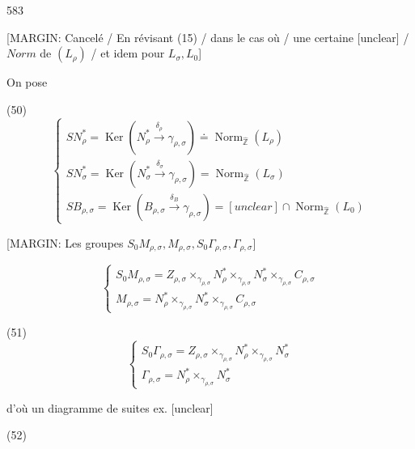 \begin{enumerate}

\newpage


583

[MARGIN: Cancelé / En révisant (15) / dans le cas où / une certaine [unclear] / $Norm$ de $(L_\rho)$ / et idem pour $L_\sigma, L_0$]

On pose

(50)
$$
\begin{cases} 
S N_\rho^* = \operatorname{Ker}( N_\rho^* \xrightarrow{\delta_\rho} \gamma_{\rho,\sigma} ) \doteq \operatorname{Norm}_{\hat{\mathbb{Z}}}(L_\rho) \\
S N_\sigma^* = \operatorname{Ker}( N_\sigma^* \xrightarrow{\delta_\sigma} \gamma_{\rho,\sigma} ) = \operatorname{Norm}_{\hat{\mathbb{Z}}}(L_\sigma) \\
S B_{\rho,\sigma} = \operatorname{Ker}( B_{\rho,\sigma} \xrightarrow{\delta_B} \gamma_{\rho,\sigma} ) = [unclear] \cap \operatorname{Norm}_{\hat{\mathbb{Z}}}(L_0) 
\end{cases}
$$

[MARGIN: Les groupes $S_0 M_{\rho,\sigma}, M_{\rho,\sigma}, S_0 \Gamma_{\rho,\sigma}, \Gamma_{\rho,\sigma}$]

$$
\begin{cases} 
S_0 M_{\rho,\sigma} = Z_{\rho,\sigma} \times_{\gamma_{\rho,\sigma}} N_\rho^* \times_{\gamma_{\rho,\sigma}} N_\sigma^* \times_{\gamma_{\rho,\sigma}} C_{\rho,\sigma} \\
M_{\rho,\sigma} = N_\rho^* \times_{\gamma_{\rho,\sigma}} N_\sigma^* \times_{\gamma_{\rho,\sigma}} C_{\rho,\sigma} 
\end{cases}
$$

(51)
$$
\begin{cases} 
S_0 \Gamma_{\rho,\sigma} = Z_{\rho,\sigma} \times_{\gamma_{\rho,\sigma}} N_\rho^* \times_{\gamma_{\rho,\sigma}} N_\sigma^* \\
\Gamma_{\rho,\sigma} = N_\rho^* \times_{\gamma_{\rho,\sigma}} N_\sigma^* 
\end{cases}
$$

d'où un diagramme de suites ex. [unclear]

(52)


\end{enumerate}
